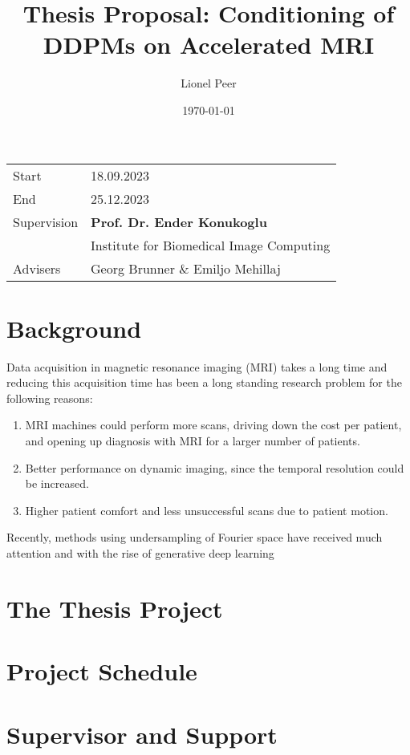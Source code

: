 \documentclass[a4paper]{article}
\title{Thesis Proposal: Conditioning of DDPMs on Accelerated MRI}
\author{Lionel Peer}
\date{\today}
\begin{document}
\maketitle
\vfill
\begin{tabular}{l l}
    Start       & 18.09.2023                               \\
    End         & 25.12.2023                               \\
    Supervision & \textbf{Prof. Dr. Ender Konukoglu}       \\
                & Institute for Biomedical Image Computing \\
    Advisers    & Georg Brunner \& Emiljo Mehillaj
\end{tabular}
\tableofcontents
\newpage

\section{Background}
Data acquisition in magnetic resonance imaging (MRI) takes a long time and reducing this acquisition time has been a long standing research problem for the following reasons:
\begin{enumerate}
    \item MRI machines could perform more scans, driving down the cost per patient, and opening up diagnosis with MRI for a larger number of patients.
    \item Better performance on dynamic imaging, since the temporal resolution could be increased.
    \item Higher patient comfort and less unsuccessful scans due to patient motion.
\end{enumerate}
Recently, methods using undersampling of Fourier space have received much attention and with the rise of generative deep learning~\cite{kingma2022autoencoding}
\section{The Thesis Project}
\section{Project Schedule}
\section{Supervisor and Support}

\printbibliography[title=References]
\end{document}
